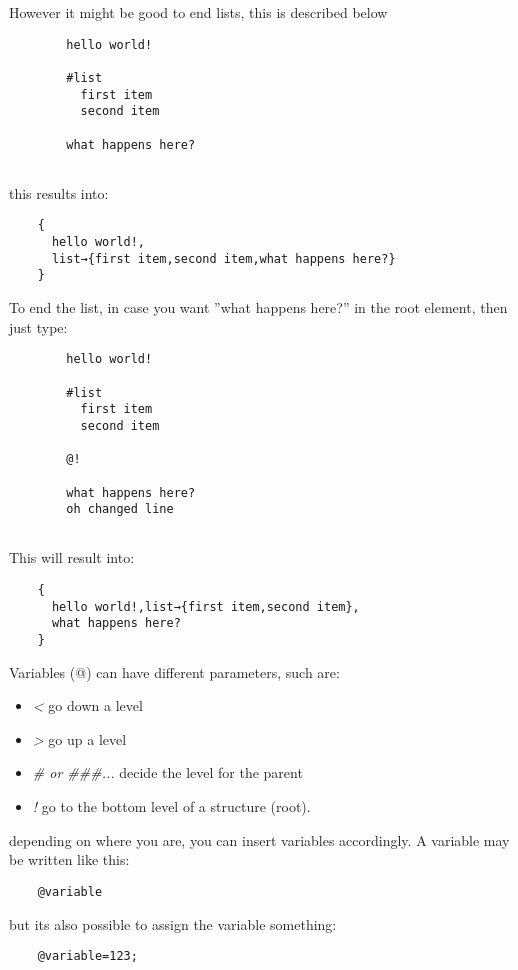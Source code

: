 \documentclass{book}
\begin{document}
	However it might be good to end lists, this is described below
	
	\begin{verbatim}
		hello world!
		
		#list
		  first item
		  second item
			
		what happens here?
		
	\end{verbatim}
	
	this results into:
	
	\begin{verbatim}
	{
	  hello world!,
	  list→{first item,second item,what happens here?}
	}
	\end{verbatim}
	
	To end the list, in case you want ''what happens here?'' in the root element, then just type:
	
	\begin{verbatim}
		hello world!
		
		#list
		  first item
		  second item
		
		@!
		
		what happens here?
		oh changed line
		
	\end{verbatim}
	
	This will result into:
	
	\begin{verbatim}
	{
	  hello world!,list→{first item,second item},
	  what happens here?
	}
	\end{verbatim}
	
	Variables (@) can have different parameters, such are:
	\begin{itemize}
		\item \emph{<} go down a level
		\item \emph{>} go up a level
		\item \emph{\# or \#\#\#...} decide the level for the parent
		\item \emph{!} go to the bottom level of a {} structure (root).
	\end{itemize}
	depending on where you are, you can insert variables accordingly. A variable may be written like this:
	
	\begin{verbatim}
	@variable
	\end{verbatim}
	
	but its also possible to assign the variable something:
	
	\begin{verbatim}
	@variable=123;
	\end{verbatim}
	
\end{document}
